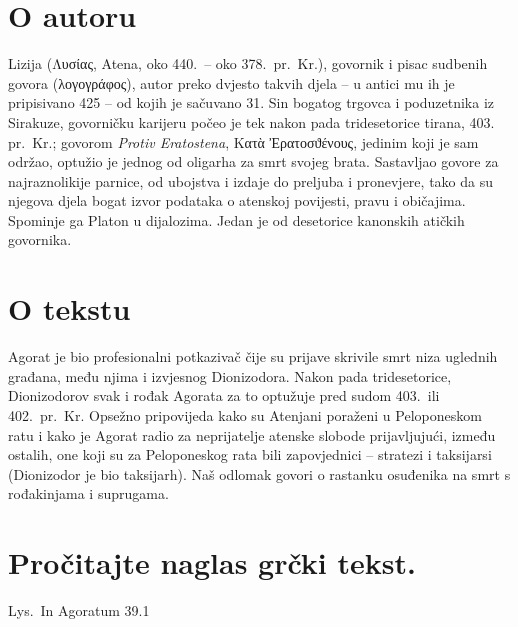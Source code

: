 
\section*{O autoru}

Lizija (Λυσίας, Atena, oko 440.\ – oko 378.\ pr.~Kr.), govornik i pisac sudbenih govora \textgreek[variant=ancient]{(λογογράφος),} autor preko dvjesto takvih djela – u antici mu ih je pripisivano 425 – od kojih je sačuvano 31. Sin bogatog trgovca i poduzetnika iz Sirakuze, govorničku karijeru počeo je tek nakon pada tridesetorice tirana, 403. pr.~Kr.; govorom \textit{Protiv Eratostena}, \textgreek[variant=ancient]{Κατὰ Ἐρατοσϑένους,} jedinim koji je sam održao, optužio je jednog od oligarha za smrt svojeg brata. Sastavljao govore za najraznolikije parnice, od ubojstva i izdaje do preljuba i pronevjere, tako da su njegova djela bogat izvor podataka o atenskoj povijesti, pravu i običajima. Spominje ga Platon u dijalozima. Jedan je od desetorice kanonskih atičkih govornika.

\section*{O tekstu}

Agorat je bio profesionalni potkazivač čije su prijave skrivile smrt niza uglednih građana, među njima i izvjesnog Dionizodora. Nakon pada tridesetorice, Dionizodorov svak i rođak Agorata za to optužuje pred sudom 403.\ ili 402.\ pr.~Kr. Opsežno pripovijeda kako su Atenjani poraženi u Peloponeskom ratu i kako je Agorat radio za neprijatelje atenske slobode prijavljujući, između ostalih, one koji su za Peloponeskog rata bili zapovjednici – stratezi i taksijarsi (Dionizodor je bio taksijarh). Naš odlomak govori o rastanku osuđenika na smrt s rođakinjama i suprugama.

\newpage

\section*{Pročitajte naglas grčki tekst.}

Lys.\ In Agoratum 39.1

\medskip

